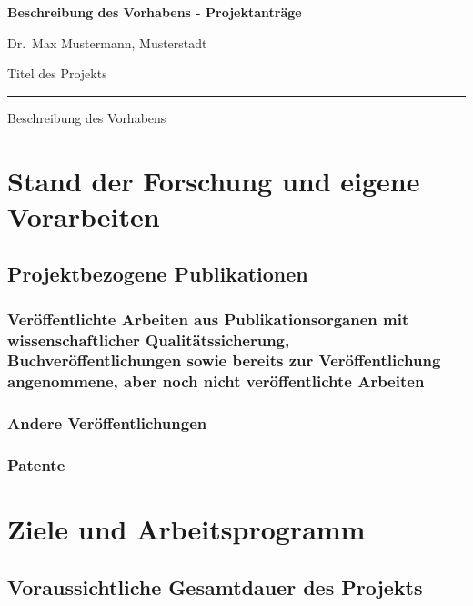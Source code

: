 \documentclass{scrartcl}
\newcommand{\applicants}{Dr.\ Max Mustermann, Musterstadt}
\newcommand{\project}{Titel des Projekts}
\begin{document}
{\raggedright{} \normalsize \bfseries 
	Beschreibung des Vorhabens - Projektanträge \par
    \applicants{} \par
    \project{} \par
	\rule{\textwidth}{0.5pt} \par
	Beschreibung des Vorhabens
}

\section{Stand der Forschung und eigene Vorarbeiten}

\subsection{Projektbezogene Publikationen}

\subsubsection{Veröffentlichte Arbeiten aus Publikationsorganen mit wissenschaftlicher Qualitätssicherung, Buchveröffentlichungen sowie bereits zur Veröffentlichung angenommene, aber noch nicht veröffentlichte Arbeiten}
\printbibliography[category=reviewed, heading=none]

\subsubsection{Andere Veröffentlichungen}
\printbibliography[category=nonreviewed, heading=none]

\subsubsection{Patente}

\printbibliography[category=patents_pending, heading=none]

\printbibliography[category=patents, heading=none]


\section{Ziele und Arbeitsprogramm}

\subsection{Voraussichtliche Gesamtdauer des Projekts}
\end{document}
